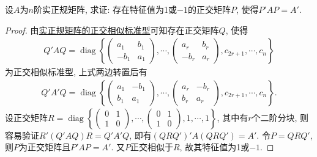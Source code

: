 \documentclass[../../main.tex]{subfiles}%
\begin{document}
\begin{example}
设\( A \)为\( n \)阶实正规矩阵, 求证: 存在特征值为1或\(-1\)的正交矩阵\( P \), 使得\( P'AP = A' \).
\end{example}
\begin{proof}
由\hyperref[theorem:实正规矩阵的正交相似标准型]{实正规矩阵的正交相似标准型}可知存在正交矩阵$Q$, 使得
\begin{align*}
Q'AQ = \operatorname{diag}\left\{ \begin{pmatrix} a_1 & b_1 \\ -b_1 & a_1 \end{pmatrix}, \cdots, \begin{pmatrix} a_r & b_r \\ -b_r & a_r \end{pmatrix}, c_{2r+1}, \cdots, c_n \right\}
\end{align*}
为正交相似标准型, 上式两边转置后有
\begin{align*}
Q'A'Q = \operatorname{diag}\left\{ \begin{pmatrix} a_1 & -b_1 \\ b_1 & a_1 \end{pmatrix}, \cdots, \begin{pmatrix} a_r & -b_r \\ b_r & a_r \end{pmatrix}, c_{2r+1}, \cdots, c_n \right\}.
\end{align*}
设正交矩阵\( R = \operatorname{diag}\left\{ \begin{pmatrix} 0 & 1 \\ 1 & 0 \end{pmatrix}, \cdots, \begin{pmatrix} 0 & 1 \\ 1 & 0 \end{pmatrix}, 1, \cdots, 1 \right\} \), 其中有\( r \)个二阶分块, 则容易验证\( R'(Q'AQ)R = Q'A'Q \), 即有\( (QRQ')'A(QRQ') = A' \). 令\( P = QRQ' \), 则\( P \)为正交矩阵且\( P'AP = A' \). 又\( P \)正交相似于\( R \), 故其特征值为1或\(-1\). 
\end{proof}
\end{document}
